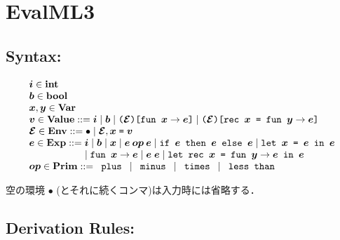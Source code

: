 \documentclass[11pt]{jarticle}
\begin{document}
\newpage

\section*{EvalML3}



\subsection*{Syntax:}

\[\begin{array}{l}
\EvalMLiiiMV{i}[] \in \mathbf{int}\\
\EvalMLiiiMV{b}[] \in \mathbf{bool}\\
\EvalMLiiiMV{x}[], \EvalMLiiiMV{y}[] \in \mathbf{Var}\\
\EvalMLiiiMV{v}[] \in \mathbf{Value} ::= \EvalMLiiiMV{i}[]
\mid \EvalMLiiiMV{b}[] \mid \EvalMLiiiFunTerm{\EvalMLiiiMV{env}[]}
{\EvalMLiiiMV{x}[]}{\EvalMLiiiMV{e}[]}
\mid \EvalMLiiiRecTerm{\EvalMLiiiMV{env}[]}{\EvalMLiiiMV{x}[]}
{\EvalMLiiiMV{y}[]}{\EvalMLiiiMV{e}[]}\\
\EvalMLiiiMV{env}[] \in \mathbf{Env} ::= \EvalMLiiiEmptyTerm
\mid \EvalMLiiiBindTerm{\EvalMLiiiMV{env}[]}{\EvalMLiiiMV{x}[]}
{\EvalMLiiiMV{v}[]}\\
\EvalMLiiiMV{e}[] \in \mathbf{Exp} ::= \EvalMLiiiMV{i}[]
\mid \EvalMLiiiMV{b}[] \mid \EvalMLiiiMV{x}[]
\mid \EvalMLiiiBinOpTerm{\EvalMLiiiMV{op}[]}{\EvalMLiiiMV{e}[]}
{\EvalMLiiiMV{e}[]} \mid \EvalMLiiiIfTerm{\EvalMLiiiMV{e}[]}
{\EvalMLiiiMV{e}[]}{\EvalMLiiiMV{e}[]}
\mid \EvalMLiiiLetTerm{\EvalMLiiiMV{x}[]}{\EvalMLiiiMV{e}[]}
{\EvalMLiiiMV{e}[]} \\ \hspace*{2.0cm}
\mid \EvalMLiiiAbsTerm{\EvalMLiiiMV{x}[]}
{\EvalMLiiiMV{e}[]} \mid \EvalMLiiiAppTerm{\EvalMLiiiMV{e}[]}
{\EvalMLiiiMV{e}[]} \mid \EvalMLiiiLetRecTerm{\EvalMLiiiMV{x}[]}
{\EvalMLiiiMV{y}[]}{\EvalMLiiiMV{e}[]}{\EvalMLiiiMV{e}[]}\\
\EvalMLiiiMV{op}[] \in \mathbf{Prim} ::= \EvalMLiiiPlusTerm
\mid \EvalMLiiiMinusTerm \mid \EvalMLiiiMultTerm
\mid \EvalMLiiiLtTerm\\
\end{array}\]

空の環境 \(\bullet\) (とそれに続くコンマ)は入力時には省略する．

\subsection*{Derivation Rules:}
\end{document}
